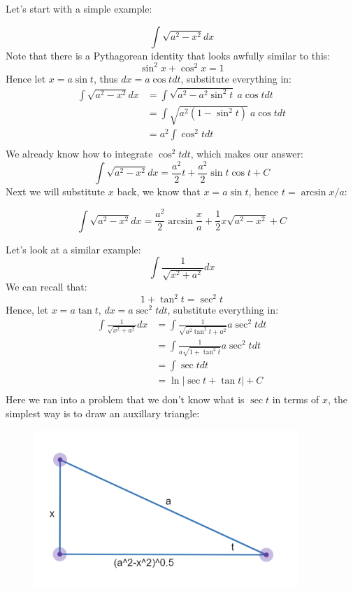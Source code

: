 \documentclass{article}
\begin{document}
Let's start with a simple example:

\[
    \int \sqrt{a^2-x^2}dx
\]
Note that there is a Pythagorean identity that looks awfully similar to this:
\[
    \sin^2 x + \cos^2 x = 1
\]
Hence let $x = a\sin t$, thus $dx = a \cos t dt$, substitute everything in:
\begin{equation} \nonumber
    \begin{split}
        \int \sqrt{a^2-x^2}dx & = \int \sqrt{a^2 - a^2\sin^2 t} \ a\cos t dt \\
        & = \int \sqrt{a^2(1-\sin^2 t)} \ a\cos t dt \\
        & = a^2 \int \cos^2 t dt \\
    \end{split}
\end{equation}
We already know how to integrate $\cos^2 t dt$, which makes our answer:
\[
    \int \sqrt{a^2-x^2}dx = \frac{a^2}{2} t + \frac{a^2}{2}\sin t \cos t +C
\]
Next we will substitute $x$ back, we know that $x = a\sin t$, hence $t = \arcsin x/a$:

\begin{equation}
    \int \sqrt{a^2-x^2}dx = \frac{a^2}{2} \arcsin \frac{x}{a} + \frac{1}{2} x \sqrt{a^2-x^2} +C
\end{equation}

Let's look at a similar example:
\[
    \int \frac{1}{\sqrt{x^2+a^2}}dx
\]
We can recall that:
\[
    1 + \tan^2 t = \sec^2 t
\]
Hence, let $x = a\tan t$, $dx = a \sec^2 t dt$, substitute everything in:
\begin{equation}\nonumber
    \begin{split}
        \int \frac{1}{\sqrt{x^2 + a^2}}dx &= \int \frac{1}{\sqrt{a^2 \tan^2 t + a^2}} a \sec^2 t dt \\
        & = \int \frac{1}{a\sqrt{1 + \tan^2 t}} a \sec^2 t dt \\ 
        & = \int \sec t dt \\
        & = \ln |\sec t + \tan t| + C\\
    \end{split} 
\end{equation}
Here we ran into a problem that we don't know what is $\sec t$ in terms of $x$, the simplest way is to draw an auxillary triangle:

\begin{figure}[H]
    \centering
    \includegraphics[width = 10cm]{pictures/trigsub.png}
\end{figure}
\end{document}
